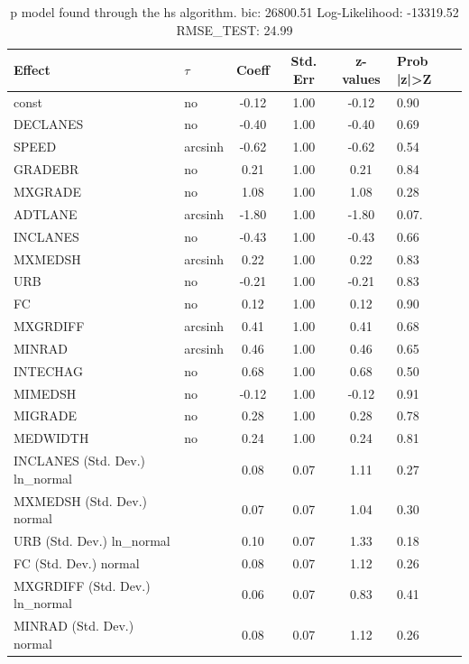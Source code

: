 \begin{table}
	\caption{p model found through the hs algorithm. bic: 26800.51 Log-Likelihood: -13319.52 RMSE_TEST: 24.99}
	\begin{center}
		\begin{tabular}{|l|l|c|c|c|l|}
			\hline
			Effect & $\tau$ & Coeff & Std. Err & z-values & Prob |z|>Z \\
			\hline
			const & no & -0.12 & 1.00 & -0.12 & 0.90 \\
			\hline
			DECLANES & no & -0.40 & 1.00 & -0.40 & 0.69 \\
			\hline
			SPEED & arcsinh & -0.62 & 1.00 & -0.62 & 0.54 \\
			\hline
			GRADEBR & no & 0.21 & 1.00 & 0.21 & 0.84 \\
			\hline
			MXGRADE & no & 1.08 & 1.00 & 1.08 & 0.28 \\
			\hline
			ADTLANE & arcsinh & -1.80 & 1.00 & -1.80 & 0.07. \\
			\hline
			INCLANES & no & -0.43 & 1.00 & -0.43 & 0.66 \\
			\hline
			MXMEDSH & arcsinh & 0.22 & 1.00 & 0.22 & 0.83 \\
			\hline
			URB & no & -0.21 & 1.00 & -0.21 & 0.83 \\
			\hline
			FC & no & 0.12 & 1.00 & 0.12 & 0.90 \\
			\hline
			MXGRDIFF & arcsinh & 0.41 & 1.00 & 0.41 & 0.68 \\
			\hline
			MINRAD & arcsinh & 0.46 & 1.00 & 0.46 & 0.65 \\
			\hline
			INTECHAG & no & 0.68 & 1.00 & 0.68 & 0.50 \\
			\hline
			MIMEDSH & no & -0.12 & 1.00 & -0.12 & 0.91 \\
			\hline
			MIGRADE & no & 0.28 & 1.00 & 0.28 & 0.78 \\
			\hline
			MEDWIDTH & no & 0.24 & 1.00 & 0.24 & 0.81 \\
			\hline
			INCLANES (Std. Dev.) ln_normal &  & 0.08 & 0.07 & 1.11 & 0.27 \\
			\hline
			MXMEDSH (Std. Dev.) normal &  & 0.07 & 0.07 & 1.04 & 0.30 \\
			\hline
			URB (Std. Dev.) ln_normal &  & 0.10 & 0.07 & 1.33 & 0.18 \\
			\hline
			FC (Std. Dev.) normal &  & 0.08 & 0.07 & 1.12 & 0.26 \\
			\hline
			MXGRDIFF (Std. Dev.) ln_normal &  & 0.06 & 0.07 & 0.83 & 0.41 \\
			\hline
			MINRAD (Std. Dev.) normal &  & 0.08 & 0.07 & 1.12 & 0.26 \\

\end{tabular}
\end{center}
\end{table}
